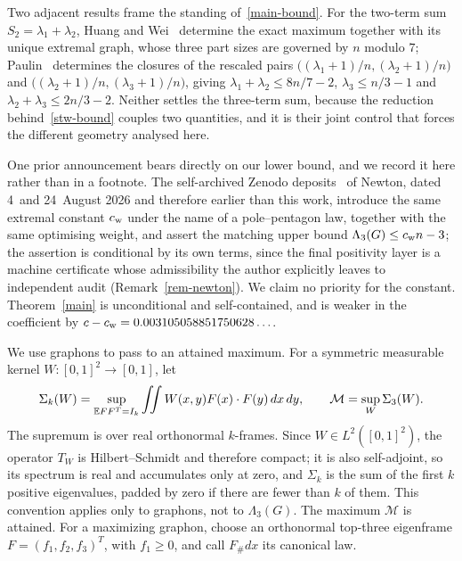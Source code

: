 Two adjacent results frame the standing of~\eqref{main-bound}. For the
two-term sum $S_2=\lambda_1+\lambda_2$, Huang and Wei~\cite{HW} determine
the exact maximum together with its unique extremal graph, whose three part
sizes are governed by $n$ modulo $7$; Paulin~\cite{Paulin} determines the
closures of the rescaled pairs
$\bigl((\lambda_1+1)/n,(\lambda_2+1)/n\bigr)$ and
$\bigl((\lambda_2+1)/n,(\lambda_3+1)/n\bigr)$, giving
$\lambda_1+\lambda_2\le8n/7-2$, $\lambda_3\le n/3-1$ and
$\lambda_2+\lambda_3\le2n/3-2$. Neither settles the three-term sum, because
the reduction behind~\eqref{stw-bound} couples two quantities, and it is
their joint control that forces the different geometry analysed here.

One prior announcement bears directly on our lower bound, and we record it
here rather than in a footnote. The self-archived Zenodo
deposits~\cite{Newton1,Newton2} of Newton, dated 4~and 24~August 2026 and
therefore earlier than this work, introduce the same extremal constant
$c_{\mathrm{w}}$ under the name of a pole--pentagon law, together with the same
optimising weight, and assert the matching upper bound
$\Lambda_3(G)\le c_{\mathrm{w}} n-3$; the assertion is conditional by its own terms,
since the final positivity layer is a machine certificate whose
admissibility the author explicitly leaves to independent audit
(Remark~\ref{rem-newton}). We claim no priority for the constant.
Theorem~\ref{main} is unconditional and self-contained, and is weaker in
the coefficient by $c-c_{\mathrm{w}}=0.003105058851750628\ldots$.

We use graphons to pass to an attained maximum. For a symmetric measurable
kernel $W:[0,1]^2\to[0,1]$, let
\begin{equation}\label{sig-definition}
 \Sigma_k(W)=\sup_{\mathbb E FF^T=I_k}
       \iint W(x,y)F(x)\cdot F(y)\,dx\,dy,
 \qquad \mathcal M=\sup_W\Sigma_3(W).
\end{equation}
The supremum is over real orthonormal $k$-frames. Since $W\in L^2([0,1]^2)$,
the operator $T_W$ is Hilbert--Schmidt and therefore compact; it is also
self-adjoint, so its spectrum is real and accumulates only at zero, and
$\Sigma_k$ is the sum of the first $k$ positive eigenvalues, padded by zero
if there are fewer than $k$ of them. This convention applies only to
graphons, not to $\Lambda_3(G)$.
The maximum $\mathcal M$ is attained. For a maximizing graphon, choose an
orthonormal top-three eigenframe $F=(f_1,f_2,f_3)^T$, with $f_1\ge0$,
and call $F_\#dx$ its canonical law.

